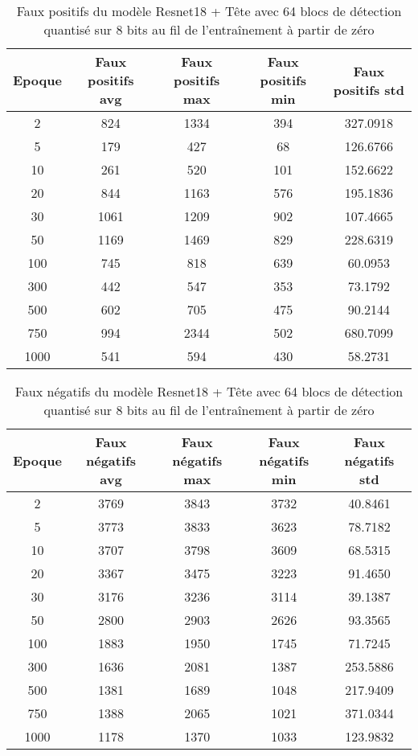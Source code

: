 \begin{table}[!ht]
    \caption{Faux positifs du modèle Resnet18 + Tête avec 64 blocs de détection quantisé sur 8 bits au fil de l'entraînement à partir de zéro}
    \label{tab:qresnet18+head_64n_false_positive_8b_from_scratch}
    \centering
    \begin{tabular}{ |c||c|c|c|c|  }
        \hline
        \rowcolor{gray!50}
        Epoque & Faux positifs avg & Faux positifs max & Faux positifs min & Faux positifs std\\
        \hline
        2 & 824 & 1334 & 394 & 327.0918\\
        5 & 179 & 427 & 68 & 126.6766\\
        10 & 261 & 520 & 101 & 152.6622\\
        20 & 844 & 1163 & 576 & 195.1836\\
        30 & 1061 & 1209 & 902 & 107.4665\\
        50 & 1169 & 1469 & 829 & 228.6319\\
        100 & 745 & 818 & 639 & 60.0953\\
        300 & 442 & 547 & 353 & 73.1792\\
        500 & 602 & 705 & 475 & 90.2144\\
        750 & 994 & 2344 & 502 & 680.7099\\
        1000 & 541 & 594 & 430 & 58.2731\\
        \hline
    \end{tabular}
\end{table}

\begin{table}[!ht]
    \caption{Faux négatifs du modèle Resnet18 + Tête avec 64 blocs de détection quantisé sur 8 bits au fil de l'entraînement à partir de zéro}
    \label{tab:qresnet18+head_64n_false_negative_8b_from_scratch}
    \centering
    \begin{tabular}{ |c||c|c|c|c|  }
        \hline
        \rowcolor{gray!50}
        Epoque & Faux négatifs avg & Faux négatifs max & Faux négatifs min & Faux négatifs std\\
        \hline
        2 & 3769 & 3843 & 3732 & 40.8461\\
        5 & 3773 & 3833 & 3623 & 78.7182\\
        10 & 3707 & 3798 & 3609 & 68.5315\\
        20 & 3367 & 3475 & 3223 & 91.4650\\
        30 & 3176 & 3236 & 3114 & 39.1387\\
        50 & 2800 & 2903 & 2626 & 93.3565\\
        100 & 1883 & 1950 & 1745 & 71.7245\\
        300 & 1636 & 2081 & 1387 & 253.5886\\
        500 & 1381 & 1689 & 1048 & 217.9409\\
        750 & 1388 & 2065 & 1021 & 371.0344\\
        1000 & 1178 & 1370 & 1033 & 123.9832\\
        \hline
    \end{tabular}
\end{table}

